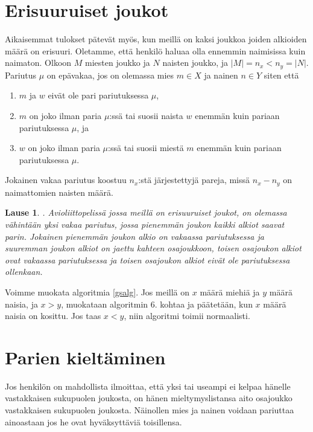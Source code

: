 \documentclass[finnish]{tktltiki2}
\newtheorem{lau}{Lause}
\theoremstyle{definition}
\theoremstyle{remark}
\begin{document}
\section{Erisuuruiset joukot}
Aikaisemmat tulokset pätevät myös, kun meillä on kaksi joukkoa joiden alkioiden määrä on erisuuri. Oletamme, että henkilö haluaa olla ennemmin naimisissa kuin naimaton.
Olkoon $M$ miesten joukko ja $N$ naisten joukko, ja $|M| = n_x < n_y = |N|$. Pariutus $\mu$ on epävakaa, jos on olemassa mies $m \in X$ ja nainen $n \in Y$ siten että

\begin{enumerate}
	\item $m$ ja $w$ eivät ole pari pariutuksessa $\mu$,
	\item $m$ on joko ilman paria $\mu$:ssä tai suosii naista $w$ enemmän kuin pariaan pariutuksessa $\mu$, ja
	\item $w$ on joko ilman paria $\mu$:ssä tai suosii miestä $m$ enemmän kuin pariaan pariutuksessa $\mu$.
\end{enumerate}
Jokainen vakaa pariutus koostuu $n_x$:stä järjestettyjä pareja, missä $n_x - n_y$ on naimattomien naisten määrä.

\begin{lau}\cite[p. 26]{gusfield1989stable}.
Avioliittopelissä jossa meillä on erisuuruiset joukot, on olemassa vähintään yksi vakaa pariutus, jossa pienemmän joukon kaikki alkiot saavat parin. Jokainen pienemmän joukon alkio on vakaassa pariutuksessa ja suuremman joukon alkiot on jaettu kahteen osajoukkoon, toisen osajoukon alkiot ovat vakaassa pariutuksessa ja toisen osajoukon alkiot eivät ole pariutuksessa ollenkaan.
\end{lau}

Voimme muokata algoritmia \ref{gsalg}. Jos meillä on $x$ määrä miehiä ja $y$ määrä naisia, ja $x > y$, muokataan algoritmin 6. kohtaa ja päätetään, kun $x$ määrä naisia on kosittu. Jos taas $x < y$, niin algoritmi toimii normaalisti.


\section{Parien kieltäminen}
Jos henkilön on mahdollista ilmoittaa, että yksi tai useampi ei kelpaa hänelle vastakkaisen sukupuolen joukosta, on hänen mieltymyslistansa aito osajoukko vastakkaisen sukupuolen joukosta. Näinollen mies ja nainen voidaan pariuttaa ainoastaan jos he ovat hyväksyttäviä toisillensa.
\end{document}
